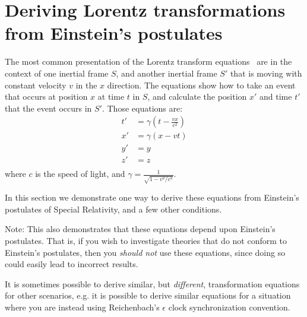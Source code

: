 \documentclass[a4paper]{article}
\theoremstyle{plain}
\theoremstyle{definition}
\begin{document}
\section{Deriving Lorentz transformations from Einstein's postulates}
\label{app:deriving-lorentz-transformations}

The most common presentation of the Lorentz transform
equations~\cite{LorentzTransformation} are in the context of one
inertial frame $S$, and another inertial frame $S'$ that is moving
with constant velocity $v$ in the $x$ direction.
The equations show how to take an event that occurs at position $x$ at
time $t$ in $S$, and calculate the position $x'$ and time $t'$ that
the event occurs in $S'$.
Those equations are:
\begin{align}
t' & = \gamma (t - \frac{vx}{c^2}) \label{eqn:1d-lorentz-transform-t-prime} \\
x' & = \gamma (x - vt) \label{eqn:1d-lorentz-transform-x-prime} \\
y' & = y \label{eqn:1d-lorentz-transform-y-prime} \\
z' & = z \label{eqn:1d-lorentz-transform-z-prime} \\
 \label{eqn:1d-lorentz-transform-gamma}
\end{align}
where $c$ is the speed of light, and
$\gamma = \frac{1}{\sqrt{1 - v^2/c^2}}$.

In this section we demonstrate one way to derive these equations from
Einstein's postulates of Special Relativity, and a few other
conditions.

Note: This also demonstrates that these equations depend upon
Einstein's postulates.  That is, if you wish to investigate theories
that do not conform to Einstein's postulates, then you
{\em should not} use these equations, since doing so could easily lead
to incorrect results.

It is sometimes possible to derive similar, but {\em different},
transformation equations for other scenarios, e.g. it is possible to
derive similar equations for a situation where you are instead using
Reichenbach's $\epsilon$ clock synchronization convention.

\newcommand{\erp}{\textbf{EP1}}
\newcommand{\esol}{\textbf{EP2}}
\newcommand{\homogeneity}{\textbf{Homogeneity}}
\newcommand{\linearity}{\textbf{Linearity}}
\end{document}
